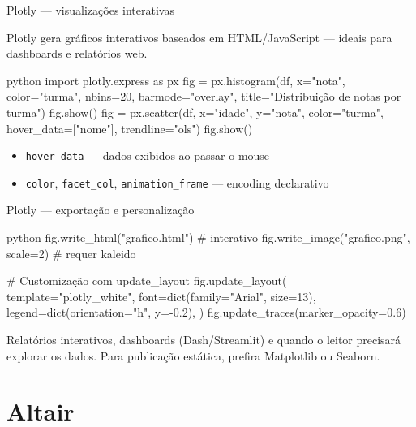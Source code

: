 \documentclass[xcolor=dvipsnames,t,aspectratio=169]{beamer}
\newcommand{\highlight}[1]{{\color{nes_dark_orange} #1}}
\begin{document}
\begin{frame}[c, fragile]{Plotly — visualizações interativas}

Plotly gera gráficos \highlight{interativos} baseados em HTML/JavaScript — ideais para dashboards e relatórios web.

\begin{code}{python}
import plotly.express as px
fig = px.histogram(df, x="nota", color="turma",
                   nbins=20, barmode="overlay",
                   title="Distribuição de notas por turma")
fig.show()
fig = px.scatter(df, x="idade", y="nota",
                 color="turma", hover_data=["nome"],
                 trendline="ols")
fig.show()
\end{code}

\begin{itemize}
    \item \texttt{hover\_data} — dados exibidos ao passar o mouse
    \item \texttt{color}, \texttt{facet\_col}, \texttt{animation\_frame} — encoding declarativo
\end{itemize}

\end{frame}


\begin{frame}[c, fragile]{Plotly — exportação e personalização}

\begin{code}{python}
fig.write_html("grafico.html")           # interativo
fig.write_image("grafico.png", scale=2)  # requer kaleido

# Customização com update_layout
fig.update_layout(
    template="plotly_white",
    font=dict(family="Arial", size=13),
    legend=dict(orientation="h", y=-0.2),
)
fig.update_traces(marker_opacity=0.6)
\end{code}

\begin{display}
Relatórios interativos, dashboards (Dash/Streamlit) e quando o leitor precisará explorar os dados. Para publicação estática, prefira Matplotlib ou Seaborn.
\end{display}

\end{frame}


\section{Altair}
\end{document}

